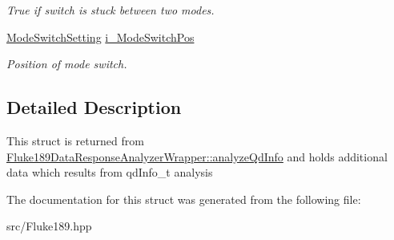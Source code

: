 \begin{DoxyCompactItemize}
\begin{DoxyCompactList}\small\item\em True if switch is stuck between two modes. \item\end{DoxyCompactList}\item 
\hypertarget{structFluke_1_1Fluke189DataResponseAnalyzerWrapper_1_1analyzedInfo__t_a066327f1ce453f5756a07b885e604198}{
\hyperlink{classFluke_1_1Fluke189DataResponseAnalyzerWrapper_a2ec2700a6086ae0ebd9601fe0c0f957a}{ModeSwitchSetting} \hyperlink{structFluke_1_1Fluke189DataResponseAnalyzerWrapper_1_1analyzedInfo__t_a066327f1ce453f5756a07b885e604198}{i\_\-ModeSwitchPos}}
\label{structFluke_1_1Fluke189DataResponseAnalyzerWrapper_1_1analyzedInfo__t_a066327f1ce453f5756a07b885e604198}

\begin{DoxyCompactList}\small\item\em Position of mode switch. \item\end{DoxyCompactList}\end{DoxyCompactItemize}


\subsection{Detailed Description}
This struct is returned from \hyperlink{classFluke_1_1Fluke189DataResponseAnalyzerWrapper_a2bec1dad601bc993375d358ef77c7e6b}{Fluke189DataResponseAnalyzerWrapper::analyzeQdInfo} and holds additional data which results from qdInfo\_\-t analysis 

The documentation for this struct was generated from the following file:\begin{DoxyCompactItemize}
\item 
src/Fluke189.hpp\end{DoxyCompactItemize}
